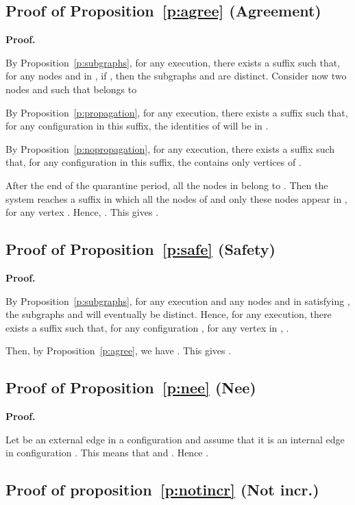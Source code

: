 \documentclass[11pt,english]{article}
\newenvironment{proof}[1][0cm]{
  \begin{list}{\bf Proof.~}{
      \setlength{\itemindent}{0cm}
      \setlength{\labelsep}{0cm}
      \setlength{\labelwidth}{#1}
      \setlength{\leftmargin}{#1}
    \item
    }
}{\hfill
  \end{list}
}
\begin{document}
\subsection{Proof of Proposition~\ref{p:agree} (Agreement)}

\begin{proof}
  By Proposition~\ref{p:subgraphs}, for any execution, there exists a suffix
  such that, for any nodes  and  in , if ,
  then the subgraphs  and  are distinct. Consider now two nodes 
  and  such that  belongs to 

  By Proposition~\ref{p:propagation}, for any execution, there exists a suffix
  such that, for any configuration  in this suffix, the identities of 
  will be in .

  By Proposition~\ref{p:nopropagation}, for any execution, there exists a suffix
  such that, for any configuration  in this suffix, the 
  contains only vertices of .

  After the end of the quarantine period, all the nodes in 
  belong to .  Then the system reaches a suffix in which all
  the nodes of  and only these nodes appear in , for any
  vertex . Hence, . This gives .
\end{proof}

\subsection{Proof of Proposition~\ref{p:safe} (Safety)}

\begin{proof}
  By Proposition~\ref{p:subgraphs}, for any execution and any nodes  and 
  in  satisfying , the subgraphs  and  will
  eventually be distinct. Hence, for any execution, there exists a suffix
   such that, for any configuration ,
  for any vertex  in , .

  Then, by Proposition~\ref{p:agree}, we have . This gives .
\end{proof}

\subsection{Proof of Proposition~\ref{p:nee} (Nee)}

 \begin{proof}
   Let  be an external edge in a configuration  and assume that it is
   an internal edge in configuration . This means that  and . Hence
   .
 \end{proof}

\subsection{Proof of proposition~\ref{p:notincr} (Not incr.)}
\end{document}
